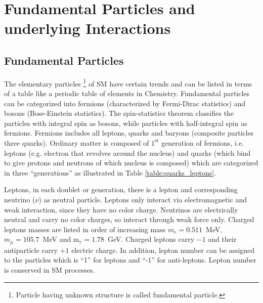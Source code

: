 \section{Fundamental Particles and underlying Interactions}\label{chapter1_sec1}
\subsection{Fundamental Particles}
The elementary particles \footnote{Particle having unknown structure is called fundamental particle.} of SM have certain trends and can be listed in terms of a table like a periodic table of elements in Chemistry. Fundamental particles can be categorized into fermions (characterized by Fermi-Dirac statistics) and bosons (Bose-Einstein statistics). 
The spin-statistics theorem classifies the particles with integral spin as bosons, while particles with half-integral spin as fermions. Fermions includes all leptons, quarks and baryons (composite particles three  quarks). 
Ordinary matter is composed of $\mathrm{1^{st}}$ generation of fermions, i.e. leptons (e.g. electron that revolves around the nucleus) and quarks (which bind to give protons and neutrons of which nucleus is composed)
which are categorized in three ``generations'' as illustrated in Table \ref{table:quarks_leptons}. 

\par Leptons, in each doublet or generation, there is a lepton and corresponding neutrino ($\nu$) as neutral particle. Leptons only interact via electromagnetic and weak interaction, since they have no color charge. 
Neutrinos are electrically neutral and carry no color charges, so interact through weak force only. 
 Charged leptons masses are listed in order of increasing mass $m_e=0.511$~MeV, $m_{\mu}=105.7$~MeV and \ensuremath{\mathrm{m_{\tau}=1.78}}~GeV.
 Charged leptons carry $-1$ and their antiparticle carry $+1$ electric charge. In addition, lepton number can be assigned to the particles which is ``1'' for leptons and ``-1'' for anti-leptons. Lepton number is conserved in SM processes.\\


